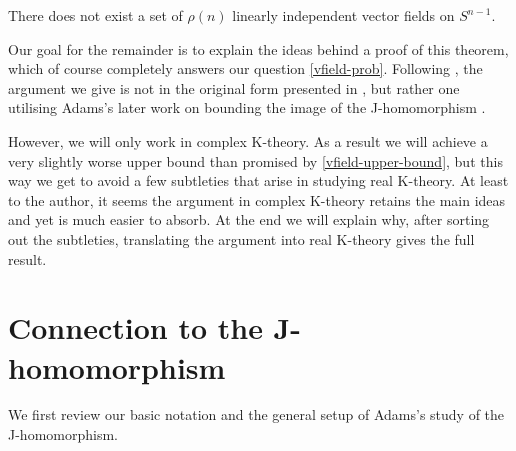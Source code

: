 \begin{theorem}
  \label{vfield-upper-bound}
  There does not exist a set of $\rho(n)$ linearly independent vector
  fields on $S^{n-1}$.
\end{theorem}

Our goal for the remainder is to explain the ideas behind a proof of
this theorem, which of course completely answers our question
\eqref{vfield-prob}. Following \cite{miller-vfields}, the argument we
give is not in the original form presented in \cite{adams-vfields},
but rather one utilising Adams's later work on bounding the image of
the J-homomorphism \cite{adams-J-II}.

However, we will only work in complex K-theory. As a result we will
achieve a very slightly worse upper bound than promised by
\eqref{vfield-upper-bound}, but this way we get to avoid a few
subtleties that arise in studying real K-theory. At least to the
author, it seems the argument in complex K-theory retains the main
ideas and yet is much easier to absorb. At the end we will explain
why, after sorting out the subtleties, translating the argument into
real K-theory gives the full result.


\section{Connection to the J-homomorphism}

We first review our basic notation and the general setup of Adams's
study of the J-homomorphism.

